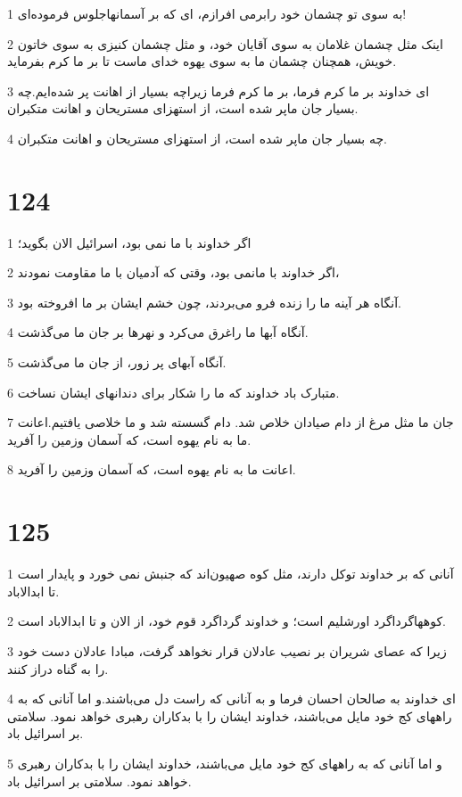 \par 1 به سوی تو چشمان خود رابرمی افرازم، ای که بر آسمانهاجلوس فرموده‌ای!
\par 2 اینک مثل چشمان غلامان به سوی آقایان خود، و مثل چشمان کنیزی به سوی خاتون خویش، همچنان چشمان ما به سوی یهوه خدای ماست تا بر ما کرم بفرماید.
\par 3 ‌ای خداوند بر ما کرم فرما، بر ما کرم فرما زیراچه بسیار از اهانت پر شده‌ایم.چه بسیار جان ماپر شده است، از استهزای مستریحان و اهانت متکبران.
\par 4 چه بسیار جان ماپر شده است، از استهزای مستریحان و اهانت متکبران.
 
\chapter{124}

\par 1 اگر خداوند با ما نمی بود، اسرائیل الان بگوید؛
\par 2 اگر خداوند با مانمی بود، وقتی که آدمیان با ما مقاومت نمودند،
\par 3 آنگاه هر آینه ما را زنده فرو می‌بردند، چون خشم ایشان بر ما افروخته بود.
\par 4 آنگاه آبها ما راغرق می‌کرد و نهرها بر جان ما می‌گذشت.
\par 5 آنگاه آبهای پر زور، از جان ما می‌گذشت.
\par 6 متبارک باد خداوند که ما را شکار برای دندانهای ایشان نساخت.
\par 7 جان ما مثل مرغ از دام صیادان خلاص شد. دام گسسته شد و ما خلاصی یافتیم.اعانت ما به نام یهوه است، که آسمان وزمین را آفرید.
\par 8 اعانت ما به نام یهوه است، که آسمان وزمین را آفرید.
 
\chapter{125}

\par 1 آنانی که بر خداوند توکل دارند، مثل کوه صهیون‌اند که جنبش نمی خورد و پایدار است تا ابدالاباد.
\par 2 کوههاگرداگرد اورشلیم است؛ و خداوند گرداگرد قوم خود، از الان و تا ابدالاباد است.
\par 3 زیرا که عصای شریران بر نصیب عادلان قرار نخواهد گرفت، مبادا عادلان دست خود را به گناه دراز کنند.
\par 4 ‌ای خداوند به صالحان احسان فرما و به آنانی که راست دل می‌باشند.و اما آنانی که به راههای کج خود مایل می‌باشند، خداوند ایشان را با بدکاران رهبری خواهد نمود. سلامتی بر اسرائیل باد.
\par 5 و اما آنانی که به راههای کج خود مایل می‌باشند، خداوند ایشان را با بدکاران رهبری خواهد نمود. سلامتی بر اسرائیل باد.
 

